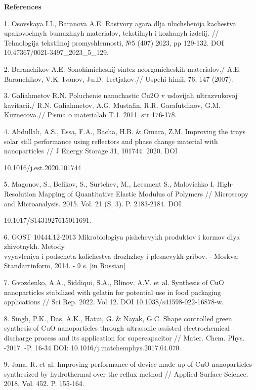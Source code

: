 \begin{center}
{\bfseries References}
\end{center}

\begin{noparindent}
1. Osovskaya I.I., Baranova A.E. Rastvory agara dlja uluchshenija
kachestva upakovochnyh bumazhnyh materialov,
tekstil\textquotesingle nyh i kozhanyh izdelij. // Tehnologija
tekstil\textquotesingle\textquotesingle noj promyshlennosti, №5 (407)
2023, pp 129-132. DOI 10.47367/0021-3497\_2023\_5\_129.

2. Baranchikov A.E. Sonohimicheskij sintez neorganicheskih materialov./
A.E. Baranchikov, V.K. Ivanov, Ju.D. Tret\textquotesingle jakov.//
Uspehi himii, 76, 147 (2007).

3. Galiahmetov R.N. Poluchenie nanochastic Cu2O v uslovijah
ul\textquotesingle trazvukovoj kavitacii./ R.N. Galiahmetov, A.G.
Mustafin, R.R. Garafutdinov, G.M. Kuznecova.// Pis\textquotesingle ma
o materialah T.1. 2011. str 176-178.

4. Abdullah, A.S., Essa, F.A., Bacha, H.B. \& Omara, Z.M. Improving the
trays solar still performance using reflectors and phase change
material with nanoparticles // J Energy Storage 31, 101744. 2020. DOI

10.1016/j.est.2020.101744

5. Magonov, S., Belikov, S., Surtchev, M., Leesment S., Malovichko I.
High-Resolution Mapping of Quantitative Elastic Modulus of Polymers //
Microscopy and Microanalysis. 2015. Vol. 21 (S. 3). P. 2183-2184. DOI

10.1017/S1431927615011691.

6. GOST 10444.12-2013 Mikrobiologiya pishchevykh produktov i kormov dlya
zhivotnykh. Metody \\vyyavleniya i podscheta kolichestva drozhzhey i
plesnevykh gribov. - Moskva: Standartinform, 2014. - 9 s. {[}in
Russian{]}

7. Gvozdenko, A.A., Siddiqui, S.A., Blinov, A.V. et al. Synthesis of CuO
nanoparticles stabilized with gelatin for potential use in food
packaging applications // Sci Rep. 2022. Vol 12. DOI
10.1038/s41598-022-16878-w.

8. Singh, P.K., Das, A.K., Hatui, G. \& Nayak, G.C. Shape controlled
green synthesis of CuO nanoparticles through ultrasonic assisted
electrochemical discharge process and its application for
supercapacitor // Mater. Chem. Phys. -2017. -P. 16-34 DOI:
10.1016/j.matchemphys.2017.04.070.

9. Jana, R. et al. Improving performance of device made up of CuO
nanoparticles synthesized by hydrothermal over the reflux method //
Applied Surface Science. 2018. Vol. 452. P. 155-164.


\end{noparindent}
